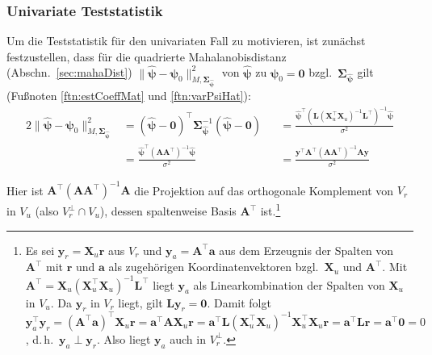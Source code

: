 \subsubsection{Univariate Teststatistik}

Um die Teststatistik für den univariaten Fall zu motivieren, ist zunächst festzustellen, dass für die quadrierte Mahalanobisdistanz (Abschn.\ \ref{sec:mahaDist}) $\|\hat{\bm{\psi}} - \bm{\psi}_{0}\|_{M, \bm{\Sigma}_{\hat{\bm{\psi}}}}^{2}$ von $\hat{\bm{\psi}}$ zu $\bm{\psi}_{0} = \bm{0}$ bzgl.\ $\bm{\Sigma}_{\hat{\bm{\psi}}}$ gilt (Fußnoten \ref{ftn:estCoeffMat} und \ref{ftn:varPsiHat}):
\begin{alignat*}{2}
\|\hat{\bm{\psi}} - \bm{\psi}_{0}\|_{M, \bm{\Sigma}_{\hat{\bm{\psi}}}}^{2} &= (\hat{\bm{\psi}} - \bm{0})^{\top} \bm{\Sigma}_{\hat{\bm{\psi}}}^{-1} (\hat{\bm{\psi}} - \bm{0}) & &= \frac{\hat{\bm{\psi}}^{\top} (\bm{L} (\bm{X}_{u}^{\top} \bm{X}_{u})^{-1} \bm{L}^{\top})^{-1} \hat{\bm{\psi}}}{\sigma^{2}}\\[2ex]
 &= \frac{\hat{\bm{\psi}}^{\top} (\bm{A} \bm{A}^{\top})^{-1} \hat{\bm{\psi}}}{\sigma^{2}} & &= \frac{\bm{y}^{\top} \bm{A}^{\top} (\bm{A} \bm{A}^{\top})^{-1} \bm{A} \bm{y}}{\sigma^{2}}
\end{alignat*}

Hier ist $\bm{A}^{\top} (\bm{A} \bm{A}^{\top})^{-1} \bm{A}$ die Projektion auf das orthogonale Komplement von $V_{r}$ in $V_{u}$ (also $V_{r}^{\perp} \cap V_{u}$), dessen spaltenweise Basis $\bm{A}^{\top}$ ist.\footnote{Es sei $\bm{y}_{r} = \bm{X}_{u} \bm{r}$ aus $V_{r}$ und $\bm{y}_{a} = \bm{A}^{\top} \bm{a}$ aus dem Erzeugnis der Spalten von $\bm{A}^{\top}$ mit $\bm{r}$ und $\bm{a}$ als zugehörigen Koordinatenvektoren bzgl.\ $\bm{X}_{u}$ und $\bm{A}^{\top}$. Mit $\bm{A}^{\top} = \bm{X}_{u} (\bm{X}_{u}^{\top} \bm{X}_{u})^{-1} \bm{L}^{\top}$ liegt $\bm{y}_{a}$ als Linearkombination der Spalten von $\bm{X}_{u}$ in $V_{u}$. Da $\bm{y}_{r}$ in $V_{r}$ liegt, gilt $\bm{L} \bm{y}_{r} = \bm{0}$. Damit folgt $\bm{y}_{a}^{\top} \bm{y}_{r} = (\bm{A}^{\top} \bm{a})^{\top} \bm{X}_{u} \bm{r} = \bm{a}^{\top} \bm{A} \bm{X}_{u} \bm{r} = \bm{a}^{\top} \bm{L} (\bm{X}_{u}^{\top} \bm{X}_{u})^{-1} \bm{X}_{u}^{\top} \bm{X}_{u} \bm{r} = \bm{a}^{\top} \bm{L} \bm{r} = \bm{a}^{\top} \bm{0} = 0$, d.\,h.\ $\bm{y}_{a} \perp \bm{y}_{r}$. Also liegt $\bm{y}_{a}$ auch in $V_{r}^{\perp}$.}

